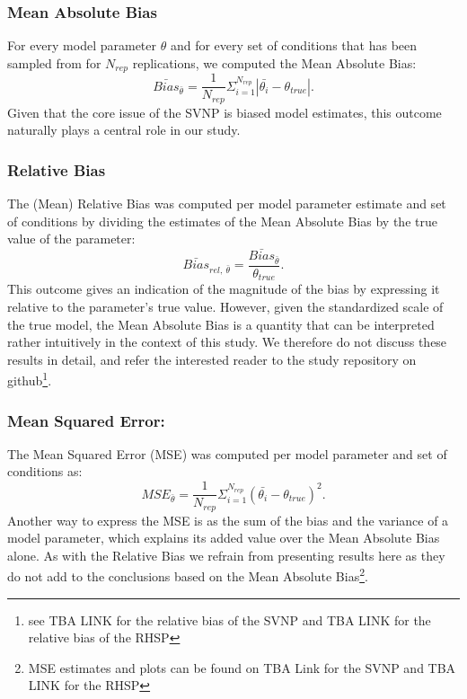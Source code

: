 \documentclass[
  man, donotrepeattitle,floatsintext]{apa6}
\begin{document}
\hypertarget{mean-absolute-bias}{%
\subsubsection{Mean Absolute Bias}\label{mean-absolute-bias}}

For every model parameter \(\theta\) and for every set of conditions that has been sampled from for \(N_{rep}\) replications, we computed the Mean Absolute Bias:
\[\bar{Bias}_{\bar{\theta}} = \frac{1}{N_{rep}} \Sigma_{i = 1}^{N_{rep}} |\bar{\theta_i} - \theta_{true}|.\]
Given that the core issue of the SVNP is biased model estimates, this outcome naturally plays a central role in our study.

\hypertarget{relative-bias}{%
\subsubsection{Relative Bias}\label{relative-bias}}

The (Mean) Relative Bias was computed per model parameter estimate and set of conditions by dividing the estimates of the Mean Absolute Bias by the true value of the parameter:
\[\bar{Bias}_{rel, \ \bar{\theta} } = \frac{\bar{Bias}_{\bar{\theta}}}{\theta_{true} }.\]
This outcome gives an indication of the magnitude of the bias by expressing it relative to the parameter's true value. However, given the standardized scale of the true model, the Mean Absolute Bias is a quantity that can be interpreted rather intuitively in the context of this study. We therefore do not discuss these results in detail, and refer the interested reader to the study repository on github\footnote{see TBA LINK for the relative bias of the SVNP and TBA LINK for the relative bias of the RHSP}.

\hypertarget{mean-squared-error}{%
\subsubsection{Mean Squared Error:}\label{mean-squared-error}}

The Mean Squared Error (MSE) was computed per model parameter and set of conditions as:
\[MSE_{\bar{\theta}} = \frac{1}{N_{rep}} \Sigma_{i = 1}^{N_{rep}} (\bar{\theta_i} - \theta_{true})^2.\]
Another way to express the MSE is as the sum of the bias and the variance of a model parameter, which explains its added value over the Mean Absolute Bias alone. As with the Relative Bias we refrain from presenting results here as they do not add to the conclusions based on the Mean Absolute Bias\footnote{MSE estimates and plots can be found on TBA Link for the SVNP and TBA LINK for the RHSP}.
\end{document}
